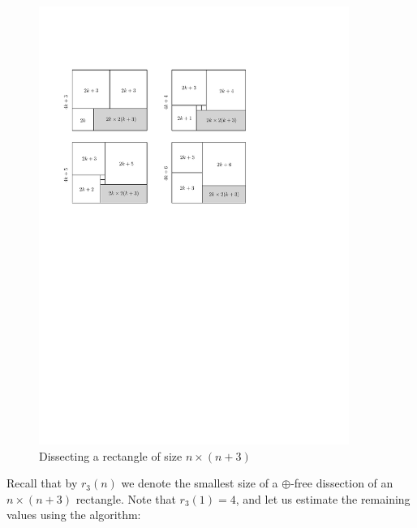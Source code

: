\begin{figure}[htb]
\centering
\includegraphics[width=0.9\textwidth]{img/kk3.pdf}
\caption{Dissecting a rectangle of size $n \times (n+3)$}
\label{fig:kk3}
\end{figure}


Recall that by $r_3(n)$ we denote the smallest size of a $\oplus$-free dissection of an $n \times (n+3)$ rectangle. Note that $r_3(1) = 4$, and let us estimate the remaining values using the algorithm:

